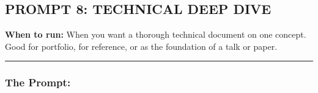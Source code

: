 \documentclass[
  11pt,
]{article}
\begin{document}
\hypertarget{prompt-8-technical-deep-dive}{%
\subsection{PROMPT 8: TECHNICAL DEEP
DIVE}\label{prompt-8-technical-deep-dive}}

\textbf{When to run:} When you want a thorough technical document on one
concept. Good for portfolio, for reference, or as the foundation of a
talk or paper.

\begin{center}\rule{0.5\linewidth}{0.5pt}\end{center}

\hypertarget{the-prompt-7}{%
\subsubsection{The Prompt:}\label{the-prompt-7}}
\end{document}
